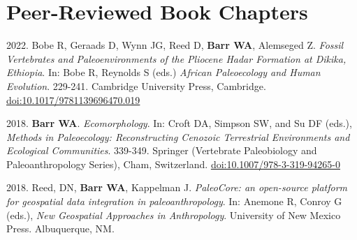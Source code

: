\section*{Peer-Reviewed Book Chapters}


\begin{etaremune} 

\item 2022.  Bobe R, Geraads D, Wynn JG, Reed D, {\bfseries Barr WA}, Alemseged Z. \emph{Fossil Vertebrates and Paleoenvironments of the Pliocene Hadar Formation at Dikika, Ethiopia}. In: Bobe R, Reynolds S (eds.) \emph{African Paleoecology and Human Evolution}. 229-241. Cambridge University Press, Cambridge. \href{https://doi.org/10.1017/9781139696470.019}{doi:10.1017/9781139696470.019}

\item 2018. {\bfseries Barr WA}. \emph{Ecomorphology}. In: Croft DA, Simpson SW, and Su DF (eds.), \emph{Methods in Paleoecology: Reconstructing Cenozoic Terrestrial Environments and Ecological Communities}. 339-349. Springer (Vertebrate Paleobiology and Paleoanthropology Series), Cham, Switzerland. \href{https://doi.org/10.1007/978-3-319-94265-0}{doi:10.1007/978-3-319-94265-0}

\item 2018. Reed, DN, {\bfseries Barr WA}, Kappelman J. \emph{PaleoCore: an open-source platform for geospatial data integration in paleoanthropology}. In: Anemone R, Conroy G (eds.), \emph{New Geospatial Approaches in Anthropology}. University of New Mexico Press. Albuquerque, NM.

\end{etaremune}
